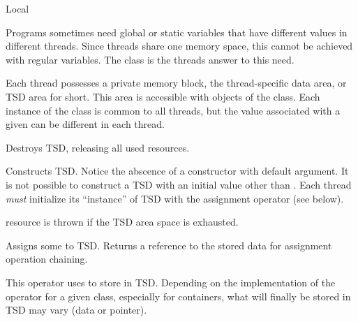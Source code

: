 
\begin{classpage}{Local}

Programs sometimes need global or static variables that have different
values in different threads. Since threads share one memory space,
this cannot be achieved with regular variables. The
 class is the \lisle threads answer to this need.

Each thread possesses a private memory block, the thread-specific data
area, or TSD area for short. This area is accessible with objects of
the  class. Each instance of the
 class is common to all threads, but the value
associated with a given  can be different in each
thread.


\begin{mandescription}
  \destructor
  Destroys  TSD, releasing all used resources.

  \constructor{}
  Constructs  TSD. Notice the abscence of a constructor
  with default argument. It is not possible to construct a TSD with an
  initial value other than . Each thread \emph{must}
  initialize its ``instance'' of  TSD with the assignment
  operator (see below).
  \begin{exception}
    \item[resource] is thrown if the TSD area space is
      exhausted.
  \end{exception}

  Assigns some  to  TSD. Returns a reference to
  the stored data for assignment operation chaining.
  
  This operator uses  to store  in
   TSD. Depending on the implementation of the \code{=}
  operator for a given  class, especially for containers,
  what will finally be stored in  TSD may vary (data or
  pointer).
  

\end{mandescription}
\end{classpage}

